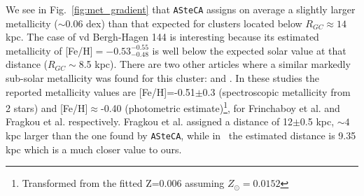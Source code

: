 \documentclass{aa}
\begin{document}
  We see in Fig.~\ref{fig:met_gradient} that \texttt{ASteCA} assigns on
  average a slightly larger metallicity ($\sim$0.06 dex) than that
  expected for clusters located below $R_{GC}\approx14$ kpc.
  The case of vd Bergh-Hagen 144 is interesting because its estimated
  metallicity of [Fe/H]$=-0.53_{-0.48}^{-0.55}$ is well below the expected
  solar value at that distance ($R_{GC}\sim$8.5 kpc). There are two other
  articles where a similar markedly sub-solar metallicity was found
  for this cluster: \cite{Frinchaboy_2004} and \cite{Fragkou_2019}. In these
  studies the reported metallicity values are [Fe/H]=-0.51$\pm$0.3 
  (spectroscopic metallicity from 2 stars) and [Fe/H]$\approx$-0.40 (photometric
  estimate)\footnote{Transformed from the fitted Z=0.006 assuming
  $Z_{\odot}=0.0152$}, for Frinchaboy et al. and Fragkou et al. respectively.
  Fragkou et al. assigned a distance of 12$\pm$0.5 kpc, $\sim4$ kpc
  larger than the one found by \texttt{ASteCA}, while in~\cite{Frinchaboy_2004b}
  the estimated distance is 9.35 kpc which is a much closer value to ours.
\end{document}
